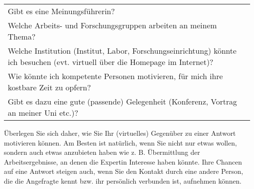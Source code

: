 \documentclass[]{article}
\begin{document}
\begin{longtable}[]{@{}lr@{}}
\begin{minipage}[t]{0.66\columnwidth}\raggedright\strut
Gibt es eine Meinungsführerin?\strut
\end{minipage} & \begin{minipage}[t]{0.28\columnwidth}\raggedleft\strut
\strut
\end{minipage}\tabularnewline
\begin{minipage}[t]{0.66\columnwidth}\raggedright\strut
Welche Arbeits- und Forschungsgruppen arbeiten an meinem Thema?\strut
\end{minipage} & \begin{minipage}[t]{0.28\columnwidth}\raggedleft\strut
\strut
\end{minipage}\tabularnewline
\begin{minipage}[t]{0.66\columnwidth}\raggedright\strut
Welche Institution (Institut, Labor, Forschungseinrichtung) könnte ich
besuchen (evt. virtuell über die Homepage im Internet)?\strut
\end{minipage} & \begin{minipage}[t]{0.28\columnwidth}\raggedleft\strut
\strut
\end{minipage}\tabularnewline
\begin{minipage}[t]{0.66\columnwidth}\raggedright\strut
Wie könnte ich kompetente Personen motivieren, für mich ihre kostbare
Zeit zu opfern?\strut
\end{minipage} & \begin{minipage}[t]{0.28\columnwidth}\raggedleft\strut
\strut
\end{minipage}\tabularnewline
\begin{minipage}[t]{0.66\columnwidth}\raggedright\strut
Gibt es dazu eine gute (passende) Gelegenheit (Konferenz, Vortrag an
meiner Uni etc.)?\strut
\end{minipage} & \begin{minipage}[t]{0.28\columnwidth}\raggedleft\strut
\strut
\end{minipage}\tabularnewline
\bottomrule
\end{longtable}

Überlegen Sie sich daher, wie Sie Ihr (virtuelles) Gegenüber zu einer
Antwort motivieren können. Am Besten ist natürlich, wenn Sie nicht nur
etwas wollen, sondern auch etwas anzubieten haben wie z. B. Übermittlung
der Arbeitsergebnisse, an denen die Expertin Interesse haben könnte.
Ihre Chancen auf eine Antwort steigen auch, wenn Sie den Kontakt durch
eine andere Person, die die Angefragte kennt bzw. ihr persönlich
verbunden ist, aufnehmen können.
\end{document}
